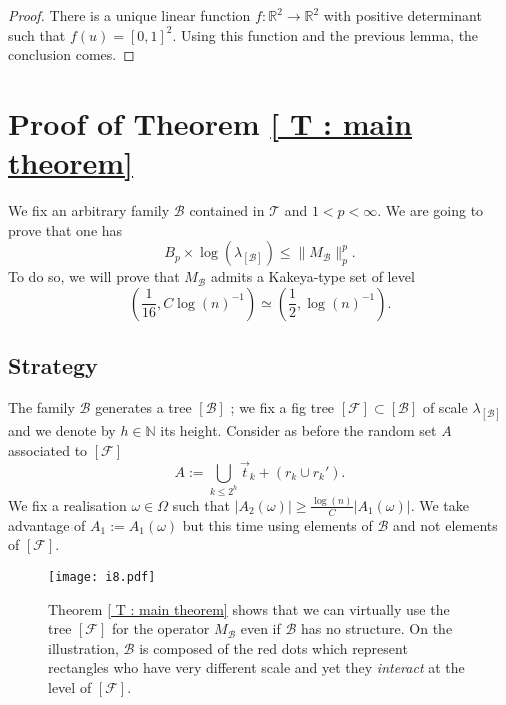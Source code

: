 \documentclass{article}
\begin{document}
\begin{proof}
There is a unique linear function $f : \mathbb{R}^2 \rightarrow \mathbb{R}^2$ with positive determinant such that $f(u) = [0,1]^2$. Using this function and the previous lemma, the conclusion comes.
\end{proof}









\section{Proof of Theorem \ref{ T : main theorem} }\label{ S : proof thm main }





We fix an arbitrary family $\mathcal{B}$ contained in $\mathcal{T}$ and $1 < p < \infty$. We are going to prove that one has $$ B_p \times \log( \lambda_{[\mathcal{B}]} ) \leq \| M_{\mathcal{B}} \|_p^p.$$ To do so, we will prove that $M_\mathcal{B}$ admits a Kakeya-type set of level $$\left(\frac{1}{16}, C \log(n)^{-1}\right)\simeq \left(\frac{1}{2}, \log(n)^{-1}\right).$$ 



\subsection*{Strategy}

The family $\mathcal{B}$ generates a tree $[\mathcal{B}]$ ; we fix a fig tree $[\mathcal{F}] \subset [\mathcal{B}]$ of scale $\lambda_{[\mathcal{B}]}$ and we denote by $h \in \mathbb{N}$ its height.  Consider as before the random set $A$ associated to $[\mathcal{F}]$  $$A := \bigcup_{k \leq 2^h} \Vec{t}_k + (r_k \cup r_k').$$ We fix a realisation $\omega \in \Omega$ such that $|A_2(\omega)| \geq \frac{\log(n)}{C}|A_1(\omega)|$. We take advantage of $A_1:=A_1(\omega)$ but this time using  elements of $\mathcal{B}$ and not elements of $[\mathcal{F}]$.


\begin{figure}[h!]
\centering
\texttt{[image: i8.pdf]}
\caption{Theorem \ref{ T : main theorem} shows that we can virtually use the tree $[\mathcal{F}]$ for the operator $M_\mathcal{B}$ even if $\mathcal{B}$ has no structure. On the illustration, $\mathcal{B}$ is composed of the red dots which represent rectangles who have very different scale and yet they \textit{interact} at the level of $[\mathcal{F}]$.}  
\end{figure}
\end{document}
